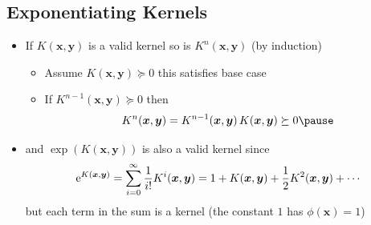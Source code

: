\begin{slide}
\section{Exponentiating Kernels}

\begin{PauseHighLight}
  \begin{itemize}
  \item If $K(\bm{x}, \bm{y})$ is a valid kernel so is 
    $K^n(\bm{x}, \bm{y})$ (by induction)\pause
    \begin{itemize}\squeeze
    \item Assume $K(\bm{x}, \bm{y}) \succeq 0$ this satisfies base case\pause
    \item If $K^{n-1} (\bm{x}, \bm{y})\succeq 0$ then
      \begin{align*}
        K^{n}(\bm{x}, \bm{y}) = K^{n-1} (\bm{x}, \bm{y}) \, K(\bm{x}, \bm{y})\succeq 0\pause
      \end{align*}
    \end{itemize}
  \item and $\exp(K(\bm{x}, \bm{y}))$ is also a valid kernel since
    \begin{align*}
      {\rm e}^{K(\bm{x}, \bm{y})} = \sum_{i=0}^\infty \frac{1}{i!} K^i(\bm{x}, \bm{y})
      = 1 + K(\bm{x}, \bm{y}) + \frac{1}{2} K^2(\bm{x}, \bm{y}) + \cdots
    \end{align*}
    but each term in the sum is a kernel (the constant $1$ has
    $\phi(\bm{x})=1$)\pause
  \end{itemize}
\end{PauseHighLight}

\end{slide}


